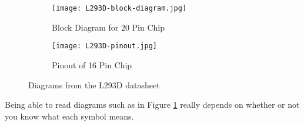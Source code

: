 \documentclass[../TinyBot.tex]{subfiles}
\begin{document}
            
            
\begin{figure}[h]
    \centering
    \begin{subfigure}{0.5\textwidth}
        \texttt{[image: L293D-block-diagram.jpg]}
        \caption{Block Diagram for 20 Pin Chip}
        \label{fig:l293d-block-diagram}
    \end{subfigure}
    \begin{subfigure}{0.3\textwidth}
        \texttt{[image: L293D-pinout.jpg]}
        \caption{Pinout of 16 Pin Chip}
        \label{fig:l293d-pinout}
    \end{subfigure}
    \caption{Diagrams from the L293D datasheet}
    \label{fig:l293d}

\end{figure}

\FloatBarrier


Being able to read diagrams such as in Figure \ref{fig:l293d-block-diagram} really depends on whether or not you know what each symbol means. \\

\end{document}
